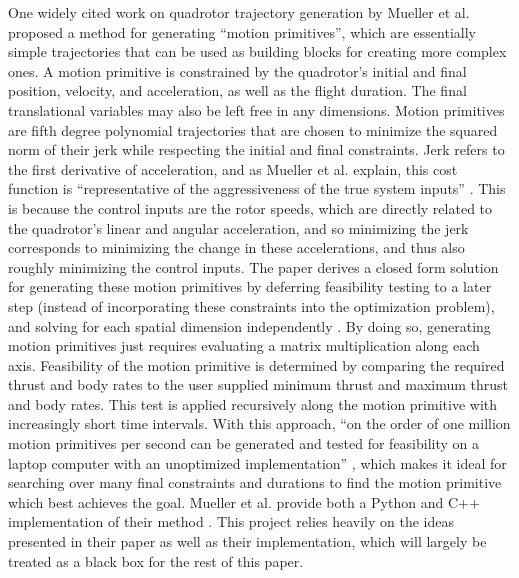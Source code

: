 \documentclass[pageno]{jpaper}
\newcommand{\quotes}[1]{``#1''}
\begin{document}
One widely cited work on quadrotor trajectory generation by Mueller et al. \cite{mueller} proposed a method for generating \quotes{motion primitives}, which are essentially simple trajectories that can be used as building blocks for creating more complex ones. A motion primitive is constrained by the quadrotor's initial and final position, velocity, and acceleration, as well as the flight duration. The final translational variables may also be left free in any dimensions. Motion primitives are fifth degree polynomial trajectories that are chosen to minimize the squared norm of their jerk while respecting the initial and final constraints. Jerk refers to the first derivative of acceleration, and as Mueller et al. explain, this cost function is \quotes{representative of the aggressiveness of the true system inputs} \cite{mueller}. This is because the control inputs are the rotor speeds, which are directly related to the quadrotor's linear and angular acceleration, and so minimizing the jerk corresponds to minimizing the change in these accelerations, and thus also roughly minimizing the control inputs. The paper derives a closed form solution for generating these motion primitives by deferring feasibility testing to a later step (instead of incorporating these constraints into the optimization problem), and solving for each spatial dimension independently \cite{mueller}. By doing so, generating motion primitives just requires evaluating a matrix multiplication along each axis. Feasibility of the motion primitive is determined by comparing the required thrust and body rates to the user supplied minimum thrust and maximum thrust and body rates. This test is applied recursively along the motion primitive with increasingly short time intervals. With this approach, \quotes{on the order of one million motion primitives per second can be generated and tested for feasibility on a laptop computer with an unoptimized implementation} \cite{mueller}, which makes it ideal for searching over many final constraints and durations to find the motion primitive which best achieves the goal. Mueller et al. provide both a Python and C++ implementation of their method \cite{generator}. This project relies heavily on the ideas presented in their paper as well as their implementation, which will largely be treated as a black box for the rest of this paper.
\end{document}
